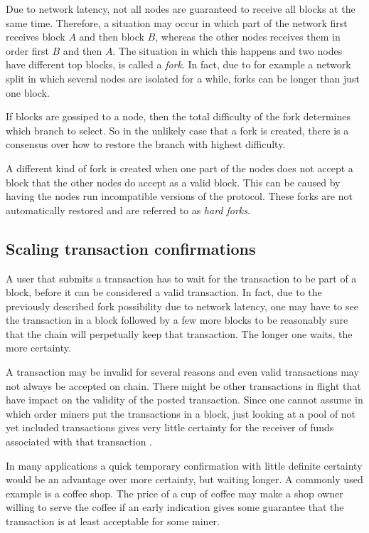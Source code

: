 Due to network latency, not all nodes are guaranteed to receive
all blocks at the same time.  Therefore, a situation may occur in
which part of the network first receives block $A$ and then block $B$,
whereas the other nodes receives them in order first $B$ and then
$A$. The situation in which this happens and two nodes have different
top blocks, is called a \textit{fork}. In fact, due to for example a network
split in which several nodes are isolated for a while, forks can be
longer than just one block.

If blocks are gossiped to a node, then the total
difficulty of the fork determines
which branch to select. So in the unlikely case that a fork is
created, there is a consensus over how to restore the branch with
highest difficulty.

A different kind of fork is created when one part of the nodes does
not accept a block that the other nodes do accept as a valid block. This
can be caused by having the nodes run incompatible versions of the
protocol. These forks are not
automatically restored and are referred to as \textit{hard forks}.

\subsection{Scaling transaction confirmations}

A user that submits a transaction has to wait for the transaction to
be part of a block, before it can be considered a valid
transaction. In fact, due to the previously described fork possibility due
to network latency, one may have to see the transaction in a block
followed by a few more blocks to be reasonably sure that the chain will
perpetually keep that transaction. The longer one waits, the more certainty.

A transaction may be invalid for several reasons and even valid
transactions may not always be accepted on chain. There might be other transactions in
flight that have impact on the validity of the posted
transaction. Since one cannot assume in which order miners put
the  transactions in a block, just looking at a pool of not yet
included transactions gives very little certainty for the receiver of
funds associated with that transaction \cite{karame2012double}.

In many applications a quick temporary confirmation with little
definite certainty would be an advantage over more certainty, but
waiting longer. A commonly used example is a coffee shop. The price of
a cup of coffee may make a shop owner willing to serve the coffee if an
early indication gives some guarantee that the transaction is at least
acceptable for some miner.

